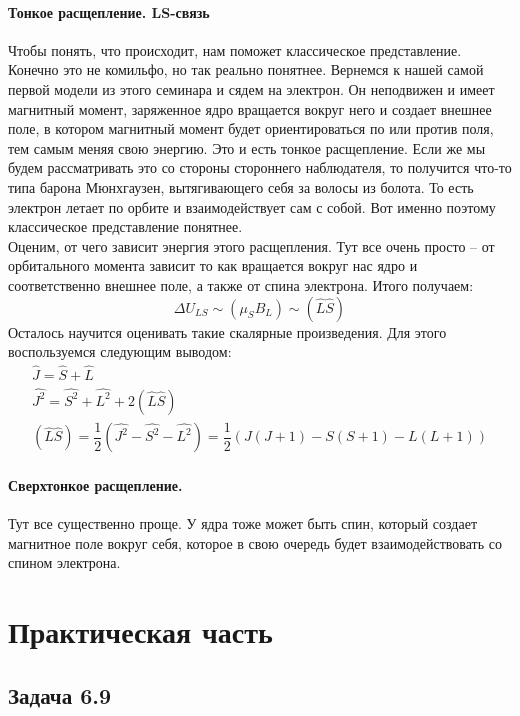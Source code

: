 \documentclass[12pt]{article}
\begin{document}
\paragraph{Тонкое расщепление. LS-связь}
Чтобы понять, что происходит, нам поможет классическое представление. Конечно это не комильфо, но так реально понятнее. Вернемся к нашей самой первой модели из этого семинара и сядем на электрон. Он неподвижен и имеет магнитный момент, заряженное ядро вращается вокруг него и создает внешнее поле, в котором магнитный момент будет ориентироваться по или против поля, тем самым меняя свою энергию. Это и есть тонкое расщепление. Если же мы будем рассматривать это со стороны стороннего наблюдателя, то получится что-то типа барона Мюнхгаузен, вытягивающего себя за волосы из болота. То есть электрон летает по орбите и взаимодействует сам с собой. Вот именно поэтому классическое представление понятнее.\\
Оценим, от чего зависит энергия этого расщепления. Тут все очень просто -- от орбитального момента зависит то как вращается вокруг нас ядро и соответственно внешнее поле, а также от спина электрона. Итого получаем: 
\begin{equation*}
    \Delta U_{LS} \sim (\mu_S B_L) \sim  ( \hat{L}\hat{S} )
\end{equation*}
Осталось научится оценивать такие скалярные произведения. Для этого воспользуемся следующим выводом:
\begin{gather*}
    \hat{J}=\hat{S}+\hat{L}\\
    \hat{J^2}=\hat{S^2}+\hat{L^2} + 2 (\hat{L}\hat{S})\\
    (\hat{L}\hat{S}) = \dfrac{1}{2} \left(\hat{J^2} -\hat{S^2} -\hat{L^2} \right) = \dfrac{1}{2} \left(J(J+1) -S(S+1) -L(L+1) \right)
\end{gather*}

\paragraph{Сверхтонкое расщепление.}
Тут все существенно проще. У ядра тоже может быть спин, который создает магнитное поле вокруг себя, которое в свою очередь будет взаимодействовать со спином электрона.


\section{Практическая часть}
\subsection{Задача 6.9}
\label{task_6.9}
\end{document}
